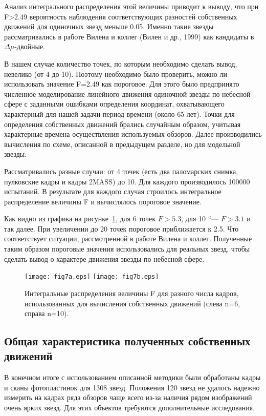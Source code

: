 Анализ интегрального распределения этой величины приводит к выводу, что при F>2.49 вероятность наблюдения соответствующих разностей собственных движений для одиночных звезд меньше 0.05. Именно такие звезды рассматривались в работе Вилена и коллег (Вилен и др., 1999) как кандидаты в $\Delta\mu$-двойные.

В нашем случае количество точек, по которым необходимо сделать вывод, невелико (от 4 до 10). Поэтому необходимо было проверить, можно ли использовать значение F=2.49 как пороговое. Для этого было предпринято численное моделирование линейного движения одиночной звезды по небесной сфере с заданными ошибками определения координат, охватывающего характерный для нашей задачи период времени (около 65 лет). Точки для определения собственных движений брались случайным образом, учитывая характерные времена осуществления используемых обзоров. Далее производились вычисления по схеме, описанной в предыдущем разделе, но для модельной звезды.

Рассматривались разные случаи: от 4 точек (есть два паломарских снимка, пулковские кадры и кадры 2MASS) до 10. Для каждого производилось 100000 испытаний. В результате для каждого случая строилось интегральное распределение величины F и вычислялось пороговое значение.

Как видно из графика на рисунке~\ref{fig:15Fint}, для 6 точек $F>5.3$, для 10 “--- $F>3.1$ и так далее. При увеличении до 20 точек пороговое приближается к 2.5. Что соответствует ситуации, рассмотренной в работе Вилена и коллег. Полученные таким образом пороговые значения использовались для реальных звезд, чтобы сделать вывод о характере движения звезды по небесной сфере.

\begin{figure}[h]
\centering
\texttt{[image: fig7a.eps]}
\texttt{[image: fig7b.eps]}
\caption{Интегральные распределения величины F для разного числа кадров, использованных для вычисления собственных движений (слева n=6, справа n=10).}
\label{fig:15Fint}
\end{figure}
\subsection{Общая характеристика полученных собственных движений} \label{subsec:ch3/sect3/sub2}
В конечном итоге с использованием описанной методики были обработаны кадры и сканы фотопластинок для 1308 звезд. Положения 120 звезд не удалось надежно измерить на кадрах ряда обзоров чаще всего из-за наличия рядом изображений очень ярких звезд. Для этих объектов требуются дополнительные исследования.

